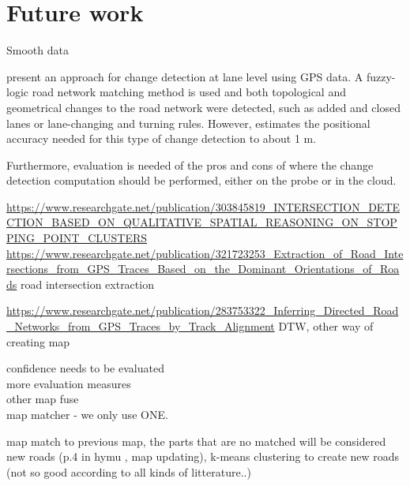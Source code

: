 \chapter{Future work}
\label{chp:future_work}

Smooth data 


\cite{yang:lanelev} present an approach for change detection at lane level using \ac{GPS} data. A fuzzy-logic road network matching method is used and both topological and geometrical changes to the road network were detected, such as added and closed lanes or lane-changing and turning rules. However, \cite{yang:lanelev} estimates the positional accuracy needed for this type of change detection to about 1 m. %



Furthermore, evaluation is needed of the pros and cons of where the change detection computation should be performed, either on the probe or in the cloud.

\url{https://www.researchgate.net/publication/303845819_INTERSECTION_DETECTION_BASED_ON_QUALITATIVE_SPATIAL_REASONING_ON_STOPPING_POINT_CLUSTERS}
\url{https://www.researchgate.net/publication/321723253_Extraction_of_Road_Intersections_from_GPS_Traces_Based_on_the_Dominant_Orientations_of_Roads} 
road intersection extraction


\url{https://www.researchgate.net/publication/283753322_Inferring_Directed_Road_Networks_from_GPS_Traces_by_Track_Alignment}
DTW, other way of creating map


confidence needs to be evaluated \\
more evaluation measures \\
other map fuse \\
map matcher - we only use ONE.


map match to previous map, the parts that are no matched will be considered new roads (p.4 in hymu , map updating), k-means clustering to create new roads (not so good according to all kinds of litterature..)

